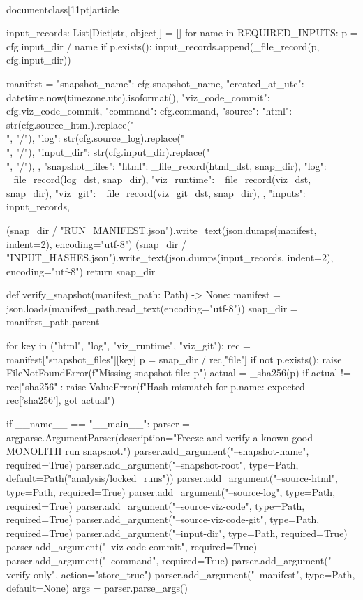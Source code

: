 \\documentclass[11pt]{article}
\begin{document}
\begin{CodeBlock}
    input_records: List[Dict[str, object]] = []
    for name in REQUIRED_INPUTS:
        p = cfg.input_dir / name
        if p.exists():
            input_records.append(_file_record(p, cfg.input_dir))

    manifest = {
        "snapshot_name": cfg.snapshot_name,
        "created_at_utc": datetime.now(timezone.utc).isoformat(),
        "viz_code_commit": cfg.viz_code_commit,
        "command": cfg.command,
        "source": {
            "html": str(cfg.source_html).replace("\\", "/"),
            "log": str(cfg.source_log).replace("\\", "/"),
            "input_dir": str(cfg.input_dir).replace("\\", "/"),
        },
        "snapshot_files": {
            "html": _file_record(html_dst, snap_dir),
            "log": _file_record(log_dst, snap_dir),
            "viz_runtime": _file_record(viz_dst, snap_dir),
            "viz_git": _file_record(viz_git_dst, snap_dir),
        },
        "inputs": input_records,
    }

    (snap_dir / "RUN_MANIFEST.json").write_text(json.dumps(manifest, indent=2), encoding="utf-8")
    (snap_dir / "INPUT_HASHES.json").write_text(json.dumps(input_records, indent=2), encoding="utf-8")
    return snap_dir


def verify_snapshot(manifest_path: Path) -> None:
    manifest = json.loads(manifest_path.read_text(encoding="utf-8"))
    snap_dir = manifest_path.parent

    for key in ("html", "log", "viz_runtime", "viz_git"):
        rec = manifest["snapshot_files"][key]
        p = snap_dir / rec["file"]
        if not p.exists():
            raise FileNotFoundError(f"Missing snapshot file: {p}")
        actual = _sha256(p)
        if actual != rec["sha256"]:
            raise ValueError(f"Hash mismatch for {p.name}: expected {rec['sha256']}, got {actual}")


if __name__ == "__main__":
    parser = argparse.ArgumentParser(description="Freeze and verify a known-good MONOLITH run snapshot.")
    parser.add_argument("--snapshot-name", required=True)
    parser.add_argument("--snapshot-root", type=Path, default=Path("analysis/locked_runs"))
    parser.add_argument("--source-html", type=Path, required=True)
    parser.add_argument("--source-log", type=Path, required=True)
    parser.add_argument("--source-viz-code", type=Path, required=True)
    parser.add_argument("--source-viz-code-git", type=Path, required=True)
    parser.add_argument("--input-dir", type=Path, required=True)
    parser.add_argument("--viz-code-commit", required=True)
    parser.add_argument("--command", required=True)
    parser.add_argument("--verify-only", action="store_true")
    parser.add_argument("--manifest", type=Path, default=None)
    args = parser.parse_args()


\end{CodeBlock}
\end{document}
